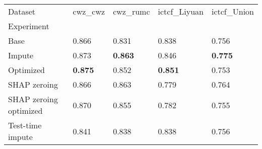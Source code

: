 \begin{tabular}{lllll}
\toprule
Dataset &         cwz_cwz &        cwz_rumc &    ictcf_Liyuan &     ictcf_Union \\
Experiment             &                 &                 &                 &                 \\
\midrule
Base                   &           0.866 &           0.831 &           0.838 &           0.756 \\
Impute                 &           0.873 &  \textbf{0.863} &           0.846 &  \textbf{0.775} \\
Optimized              &  \textbf{0.875} &           0.852 &  \textbf{0.851} &           0.753 \\
SHAP zeroing           &           0.866 &           0.863 &           0.779 &           0.764 \\
SHAP zeroing optimized &           0.870 &           0.855 &           0.782 &           0.755 \\
Test-time impute       &           0.841 &           0.838 &           0.838 &           0.756 \\
\bottomrule
\end{tabular}
